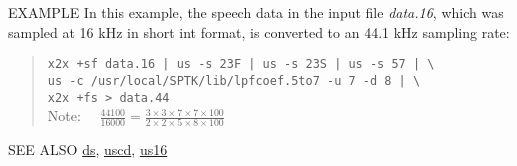 \begin{options}
\end{options}

\begin{qsection}{EXAMPLE}
In this example, the speech data in the input file {\em data.16},
which was sampled at 16 kHz in short int format, is converted to
an 44.1 kHz sampling rate:
\begin{quote}
\verb!x2x +sf data.16 | us -s 23F | us -s 23S | us -s 57 | \! \\
\verb!us -c /usr/local/SPTK/lib/lpfcoef.5to7 -u 7 -d 8 | \! \\
\verb!x2x +fs > data.44! \\ [5mm]
Note:~~
$\displaystyle\frac{44100}{16000} = 
	\frac{3\times3\times7\times7\times100}{2\times2\times5\times8\times100}$
\end{quote}
\end{qsection}


\begin{qsection}{SEE ALSO}
 \hyperlink{ds}{ds},
 \hyperlink{uscd}{uscd},
 \hyperlink{us16}{us16}
\end{qsection}
